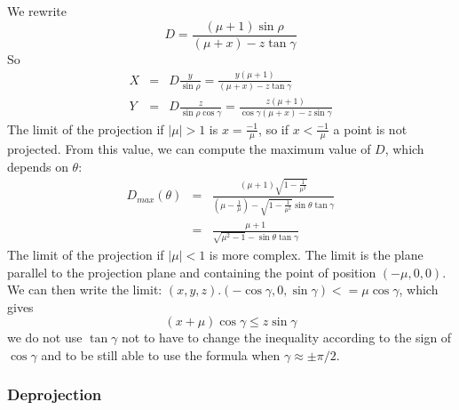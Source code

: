       We rewrite
      \begin{equation} 
        D = \frac{(\mu + 1) \sin\rho}{(\mu + x) - z\tan\gamma}
      \end{equation}
      So
      \begin{eqnarray}
        X & = & D \frac{y}{\sin\rho}           = \frac{y(\mu + 1)}{(\mu + x) - z\tan\gamma} \\
        Y & = & D \frac{z}{\sin\rho\cos\gamma} = \frac{z(\mu + 1)}{\cos\gamma(\mu + x) - z\sin\gamma}
      \end{eqnarray}
      The limit of the projection if $|\mu|>1$ is $x = \frac{-1}{\mu}$, so if $x < \frac{-1}{\mu}$ a
      point is not projected.
      From this value, we can compute the maximum value of $D$, which depends on $\theta$:
      \begin{eqnarray}
        D_{max}(\theta) & = & \frac{(\mu + 1)\sqrt{1 - \frac{1}{\mu^2}}}
	                           {(\mu - \frac{1}{\mu}) - \sqrt{1 - \frac{1}{\mu^2}}\sin\theta\tan\gamma} \\
                        & = & \frac{\mu + 1}{\sqrt{\mu^2 - 1} - \sin\theta\tan\gamma}
      \end{eqnarray}
      The limit of the projection if $|\mu|<1$ is more complex.
      The limit is the plane parallel to the projection plane and containing the point of position
      $(-\mu, 0, 0)$.
      We can then write the limit: $(x, y, z).(-\cos\gamma, 0, \sin\gamma) <= \mu\cos\gamma$, which gives
      \begin{equation}
        (x+\mu)\cos\gamma \le z\sin\gamma
      \end{equation}
      we do not use $\tan\gamma$ not to have to change the inequality according to the sign of $\cos\gamma$
      and to be still able to use the formula when $\gamma\approx\pm \pi/2$.

\subsubsection{Deprojection}

